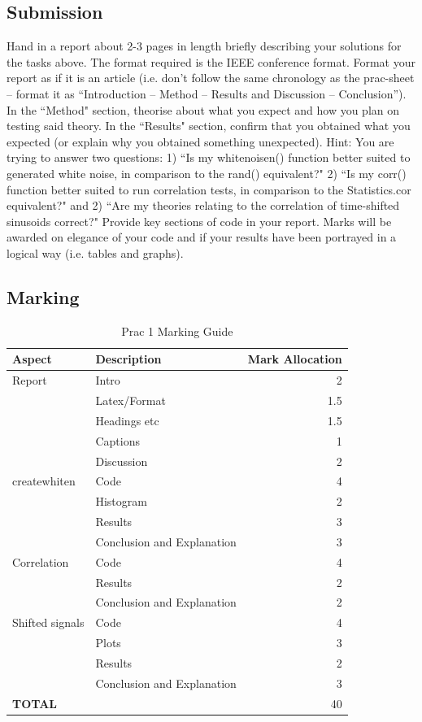 \subsection{Submission}
Hand in a report about 2-3 pages in length briefly describing your solutions for the tasks above. The format required is the IEEE conference format. Format your report as if it is an article (i.e. don’t follow the same chronology as the prac-sheet – format it as “Introduction – Method – Results and Discussion – Conclusion”). In the ``Method" section, theorise about what you expect and how you plan on testing said theory. In the ``Results" section, confirm that you obtained what you expected (or explain why you obtained something unexpected). Hint: You are trying to answer two questions: 1) ``Is my whitenoisen() function better suited to generated white noise, in comparison to the rand() equivalent?" 2) ``Is my corr() function better suited to run correlation tests, in comparison to the Statistics.cor equivalent?" and 2) ``Are my theories relating to the correlation of time-shifted sinusoids correct?" Provide key sections of code in your report. Marks will be awarded on elegance of your code and if your results have been portrayed in a logical way (i.e. tables and graphs).

\subsection{Marking}
\begin{table}[H]
\centering
\caption{Prac 1 Marking Guide}
\label{tbl:Prac1Marks}
\begin{tabular}{|l|l|r|}
\hline
\textbf{Aspect} & \textbf{Description} & \multicolumn{1}{l|}{\textbf{Mark Allocation}} \\ \hline
Report & Intro & 2 \\ \hline
 & Latex/Format & 1.5 \\ \hline
 & Headings etc & 1.5 \\ \hline
 & Captions & 1 \\ \hline
 & Discussion & 2 \\ \hline
createwhiten & Code & 4 \\ \hline
 & Histogram & 2 \\ \hline
 & Results & 3 \\ \hline
 & Conclusion and Explanation & 3 \\ \hline
Correlation & Code & 4 \\ \hline
 & Results & 2\\ \hline
 & Conclusion and Explanation & 2 \\ \hline
Shifted signals & Code & 4 \\ \hline
 & Plots & 3 \\ \hline
 & Results & 2 \\ \hline
 & Conclusion and Explanation & 3 \\ \hline

\textbf{TOTAL} &  & 40 \\ \hline
\end{tabular}
\end{table}
